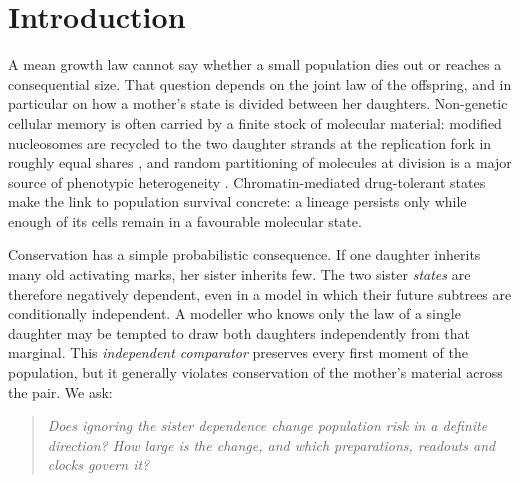 \documentclass[11pt]{article}
\theoremstyle{remark}
\begin{document}
\section{Introduction}

A mean growth law cannot say whether a small population dies out or reaches a
consequential size. That question depends on the joint law of the offspring,
and in particular on how a mother's state is divided between her daughters.
Non-genetic cellular memory is often carried by a finite stock of molecular
material: modified nucleosomes are recycled to the two daughter strands at
the replication fork in roughly equal shares
\cite{alabert2012,petryk2018,yu2018}, and random partitioning of molecules at
division is a major source of phenotypic heterogeneity
\cite{huh2011ng,huh2011pnas}. Chromatin-mediated drug-tolerant states
\cite{sharma2010,shaffer2017,oren2021} make the link to population survival
concrete: a lineage persists only while enough of its cells remain in a
favourable molecular state.

Conservation has a simple probabilistic consequence. If one daughter inherits
many old activating marks, her sister inherits few. The two sister
\emph{states} are therefore negatively dependent, even in a model in which
their future subtrees are conditionally independent. A modeller who knows
only the law of a single daughter may be tempted to draw both daughters
independently from that marginal. This \emph{independent comparator}
preserves every first moment of the population, but it generally violates
conservation of the mother's material across the pair. We ask:
\begin{quote}
\emph{Does ignoring the sister dependence change population risk in a
definite direction? How large is the change, and which preparations, readouts
and clocks govern it?}
\end{quote}
\end{document}
